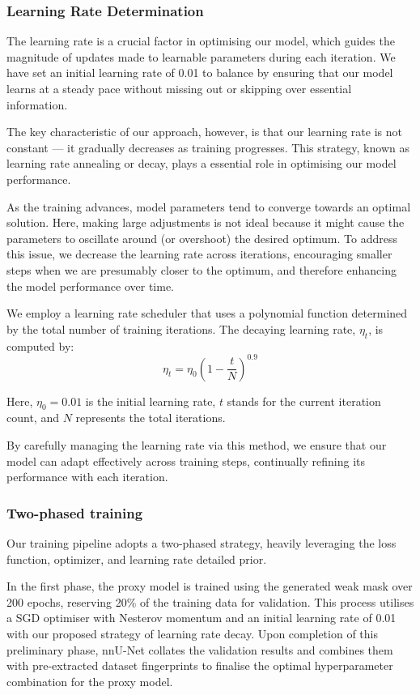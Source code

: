\subsubsection*{Learning Rate Determination}
The learning rate is a crucial factor in optimising our model, which guides the magnitude of updates made to learnable parameters during each iteration. We have set an initial learning rate of 0.01 to balance by ensuring that our model learns at a steady pace without missing out or skipping over essential information.

The key characteristic of our approach, however, is that our learning rate is not constant — it gradually decreases as training progresses. This strategy, known as learning rate annealing or decay, plays a essential role in optimising our model performance.

As the training advances, model parameters tend to converge towards an optimal solution. Here, making large adjustments is not ideal because it might cause the parameters to oscillate around (or overshoot) the desired optimum. To address this issue, we decrease the learning rate across iterations, encouraging smaller steps when we are presumably closer to the optimum, and therefore enhancing the model performance over time.

We employ a learning rate scheduler that uses a polynomial function determined by the total number of training iterations. The decaying learning rate, \( \eta_{t} \), is computed by:
\[
\eta_{t} = \eta_{0}(1 - \frac{t}{N})^{0.9}
\]

Here, \( \eta_{0} = 0.01 \) is the initial learning rate, \( t \) stands for the current iteration count, and \( N \) represents the total iterations.

By carefully managing the learning rate via this method, we ensure that our model can adapt effectively across training steps, continually refining its performance with each iteration.

\subsubsection*{Two-phased training}
Our training pipeline adopts a two-phased strategy, heavily leveraging the loss function, optimizer, and learning rate detailed prior.

In the first phase, the proxy model is trained using the generated weak mask over 200 epochs, reserving 20\% of the training data for validation. This process utilises a SGD optimiser with Nesterov momentum and an initial learning rate of 0.01 with our proposed strategy of learning rate decay. Upon completion of this preliminary phase, nnU-Net collates the validation results and combines them with pre-extracted dataset fingerprints to finalise the optimal hyperparameter combination for the proxy model.

